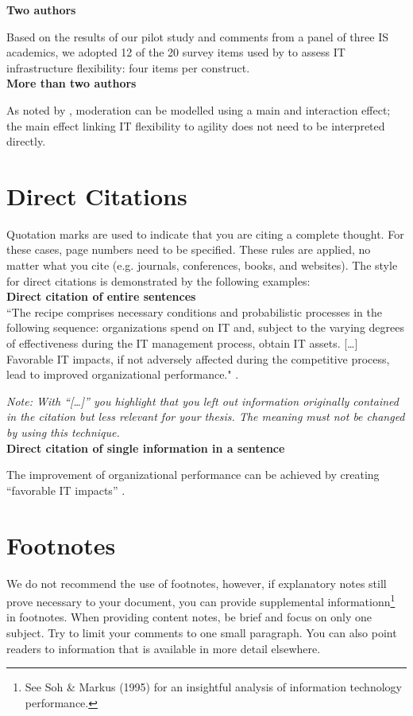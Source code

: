 \textbf{Two authors}

Based on the results of our pilot study and comments from a panel of three IS academics, we adopted 12 of the 20 survey items used by \cite{terry2000measuring} to assess IT infrastructure flexibility: four items per construct.\\

\textbf{More than two authors}

As noted by \citet*{chin2003partial}, moderation can be modelled using a main and interaction effect; the main effect linking IT flexibility to agility does not need to be interpreted directly.

\section{Direct Citations}
Quotation marks are used to indicate that you are citing a complete thought. For these cases, page numbers need to be specified. These rules are applied, no matter what you cite (e.g. journals, conferences, books, and websites). The style for direct citations is demonstrated by the following examples:\\

\textbf{Direct citation of entire sentences}\\
``The recipe comprises necessary conditions and probabilistic processes in the following sequence: organizations spend on IT and, subject to the varying degrees of effectiveness during the IT management process, obtain IT assets. […] Favorable IT impacts, if not adversely affected during the competitive process, lead to improved organizational performance." \citep*[p.~39]{soh1995creates}.

\textit{Note: With “[…]” you highlight that you left out information originally contained in the citation but less relevant for your thesis. The meaning must not be changed by using this technique.}\\

\textbf{Direct citation of single information in a sentence}

The improvement of organizational performance can be achieved by creating “favorable IT impacts” \citep*[p.~39]{soh1995creates}.
\section{Footnotes}
We do not recommend the use of footnotes, however, if explanatory notes still prove necessary to your document, you can provide supplemental informationn\footnote{  See Soh \& Markus (1995) for an insightful analysis of information technology performance.}  in footnotes. When providing content notes, be brief and focus on only one subject. Try to limit your comments to one small paragraph. You can also point readers to information that is available in more detail elsewhere.



